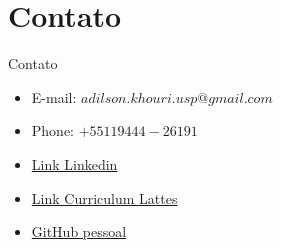 \section{Contato}

\begin{frame}	
	\begin{block}{Contato}	
		\begin{itemize}
			\item E-mail:  $adilson.khouri.usp@gmail.com$
			\item Phone: $+55 11 9444-26191$
			\item \href{https://www.linkedin.com/in/adilson-khouri-51893918/}{Link Linkedin}
			\item \href{http://lattes.cnpq.br/2654721135214993}{Link Curriculum Lattes}
			\item \href{https://github.com/khouri/}{GitHub pessoal}
		\end{itemize}
	\end{block}
\end{frame}

